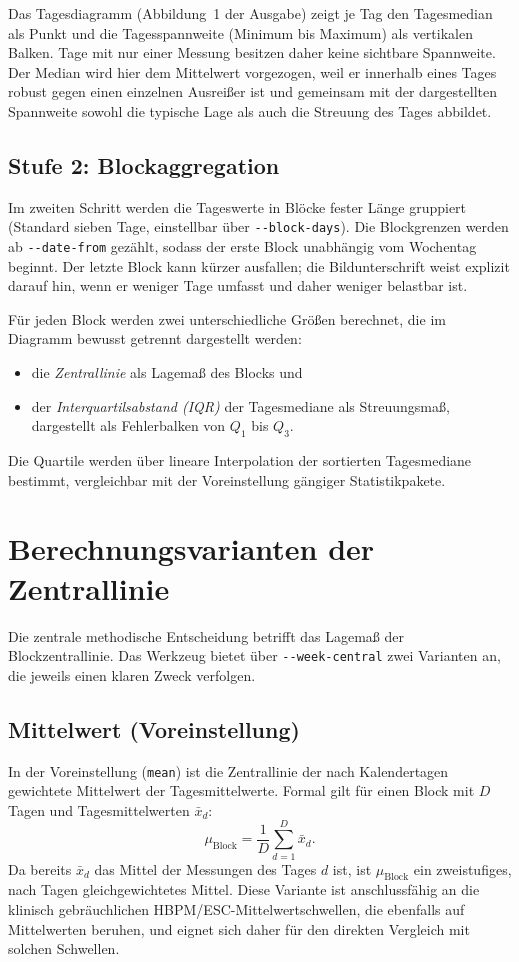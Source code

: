\documentclass[conference]{IEEEtran}
\newcommand{\param}[1]{\texttt{#1}}
\begin{document}
Das Tagesdiagramm (Abbildung~1 der Ausgabe) zeigt je Tag den Tagesmedian als
Punkt und die Tagesspannweite (Minimum bis Maximum) als vertikalen Balken. Tage
mit nur einer Messung besitzen daher keine sichtbare Spannweite. Der Median
wird hier dem Mittelwert vorgezogen, weil er innerhalb eines Tages robust gegen
einen einzelnen Ausreißer ist und gemeinsam mit der dargestellten Spannweite
sowohl die typische Lage als auch die Streuung des Tages abbildet.

\subsection{Stufe 2: Blockaggregation}
Im zweiten Schritt werden die Tageswerte in Blöcke fester Länge gruppiert
(Standard sieben Tage, einstellbar über \param{-{}-block-days}). Die
Blockgrenzen werden ab \param{-{}-date-from} gezählt, sodass der erste Block
unabhängig vom Wochentag beginnt. Der letzte Block kann kürzer ausfallen; die
Bildunterschrift weist explizit darauf hin, wenn er weniger Tage umfasst und
daher weniger belastbar ist.

Für jeden Block werden zwei unterschiedliche Größen berechnet, die im Diagramm
bewusst getrennt dargestellt werden:
\begin{itemize}
\item die \emph{Zentrallinie} als Lagemaß des Blocks und
\item der \emph{Interquartilsabstand (IQR)} der Tagesmediane als Streuungsmaß,
dargestellt als Fehlerbalken von $Q_1$ bis $Q_3$.
\end{itemize}
Die Quartile werden über lineare Interpolation der sortierten Tagesmediane
bestimmt, vergleichbar mit der Voreinstellung gängiger Statistikpakete.

\section{Berechnungsvarianten der Zentrallinie}
Die zentrale methodische Entscheidung betrifft das Lagemaß der Blockzentrallinie.
Das Werkzeug bietet über \param{-{}-week-central} zwei Varianten an, die jeweils
einen klaren Zweck verfolgen.

\subsection{Mittelwert (Voreinstellung)}
In der Voreinstellung (\texttt{mean}) ist die Zentrallinie der nach
Kalendertagen gewichtete Mittelwert der Tagesmittelwerte. Formal gilt für einen
Block mit $D$ Tagen und Tagesmittelwerten $\bar{x}_d$:
\begin{equation}
\mu_{\mathrm{Block}} = \frac{1}{D}\sum_{d=1}^{D} \bar{x}_d .
\end{equation}
Da bereits $\bar{x}_d$ das Mittel der Messungen des Tages $d$ ist, ist
$\mu_{\mathrm{Block}}$ ein zweistufiges, nach Tagen gleichgewichtetes Mittel.
Diese Variante ist anschlussfähig an die klinisch gebräuchlichen
HBPM/ESC-Mittelwertschwellen, die ebenfalls auf Mittelwerten beruhen, und
eignet sich daher für den direkten Vergleich mit solchen Schwellen.
\end{document}
